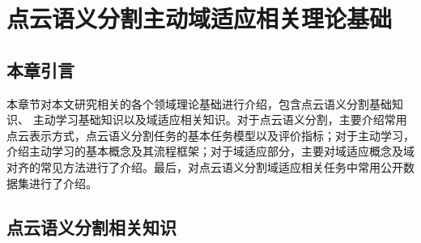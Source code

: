 \chapter{点云语义分割主动域适应相关理论基础}
\thispagestyle{others}
\pagestyle{others}
\xiaosi
\section{本章引言}
本章节对本文研究相关的各个领域理论基础进行介绍，包含点云语义分割基础知识、 主动学习基础知识以及域适应相关知识。对于点云语义分割，主要介绍常用点云表示方式，点云语义分割任务的基本任务模型以及评价指标；对于主动学习，介绍主动学习的基本概念及其流程框架；对于域适应部分，主要对域适应概念及域对齐的常见方法进行了介绍。最后，对点云语义分割域适应相关任务中常用公开数据集进行了介绍。

\section{点云语义分割相关知识}
